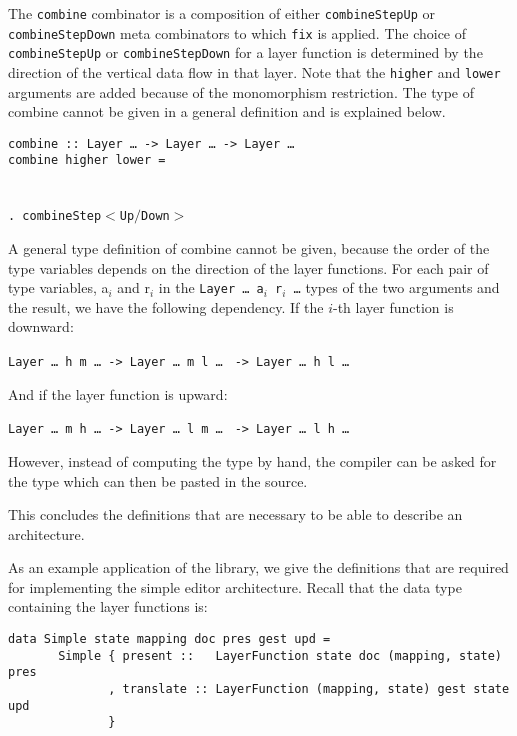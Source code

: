 The \texttt{combine} combinator is a composition of either \texttt{combineStepUp} or \texttt{combineStepDown} meta combinators to which \texttt{fix} is applied. The choice of \texttt{combineStepUp} or \texttt{combineStepDown} for a layer function is determined by the direction of the vertical data flow in that layer. Note that the \texttt{higher} and \texttt{lower} arguments are added because of the monomorphism restriction. The type of combine cannot be given in a general definition and is explained below.

\begin{tabbing}
{\tt combine}\verb| :: |{\tt Layer \dots}\verb| -> |{\tt Layer \dots}\verb| -> |{\tt Layer \dots }\\
{\tt co}\={\tt mbin}\={\tt e higher lower = }\\
\\
\>\>{\tt \dots}\\ 
\>\>\verb|. combine|{\tt Step$<$Up$/$Down$>$}\\
\>
\end{tabbing}

A general type definition of combine cannot be given, because the order of the type variables depends on the direction of the layer functions. For each pair of type variables, a$_i$ and r$_i$ in the \texttt{Layer \dots~a$_i$ r$_i$ \dots} types of the two arguments and the result, we have the following dependency. If the $i$-th layer function is downward:

{\tt Layer \dots~h m \dots}\verb| -> |{\tt Layer \dots~m l \dots} \verb| -> |{\tt Layer \dots~h l \dots}

And if the layer function is upward:

{\tt Layer \dots~m h \dots}\verb| -> |{\tt Layer \dots~l m \dots} \verb| -> |{\tt Layer \dots~l h \dots}

However, instead of computing the type by hand, the compiler can be asked for the type which can then be pasted in the source.

This concludes the definitions that are necessary to be able to describe an architecture. 


 As an example application of the library, we give the definitions that are required for implementing the simple editor architecture. Recall that the data type containing the layer functions is:

\begin{small}
\begin{verbatim}
data Simple state mapping doc pres gest upd =
       Simple { present ::   LayerFunction state doc (mapping, state) pres
              , translate :: LayerFunction (mapping, state) gest state upd
              }
\end{verbatim}
\end{small}

